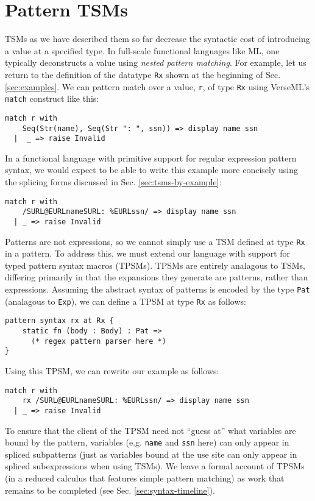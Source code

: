 {\chapter{Pattern TSMs}\label{sec:pattern-tsms}
TSMs as we have described them so far decrease the syntactic cost of introducing a value at a specified type. In full-scale functional languages like ML, one typically deconstructs a value using \emph{nested pattern matching}. For example, let us return to the definition of the datatype \lstinline{Rx} shown at the beginning of Sec. \ref{sec:examples}. We can pattern match over a value, \lstinline{r}, of type \lstinline{Rx} using VerseML's \lstinline{match} construct like this:
\begin{lstlisting}[numbers=none]
match r with 
    Seq(Str(name), Seq(Str ": ", ssn)) => display name ssn
  |  _ => raise Invalid
\end{lstlisting}
In a functional language with primitive support for regular expression pattern syntax, we would expect to be able to write this example more concisely using the splicing forms discussed in Sec. \ref{sec:tsms-by-example}:
\begin{lstlisting}[numbers=none]
match r with 
    /SURL@EURLnameSURL: %EURLssn/ => display name ssn
  | _ => raise Invalid
\end{lstlisting}

Patterns are not expressions, so we cannot simply use a TSM defined at type \lstinline{Rx} in a pattern. To address this, we must extend our language with support for typed pattern syntax macros (TPSMs). TPSMs are entirely analagous to TSMs, differing primarily in that the expansions they generate are patterns, rather than expressions. Assuming the abstract syntax of patterns is encoded by the type \lstinline{Pat} (analagous to \lstinline{Exp}), we can define a TPSM at type \lstinline{Rx} as follows:
\begin{lstlisting}[numbers=none]
pattern syntax rx at Rx {
	static fn (body : Body) : Pat => 
	  (* regex pattern parser here *)
}
\end{lstlisting}

Using this TPSM, we can rewrite our example as follows:
\begin{lstlisting}[numbers=none]
match r with 
    rx /SURL@EURLnameSURL: %EURLssn/ => display name ssn
  | _ => raise Invalid
\end{lstlisting}
To ensure that the client of the TPSM need not ``guess at'' what variables are bound by the pattern, variables (e.g. \lstinline{name} and \lstinline{ssn} here) can only appear in spliced subpatterns (just as variables bound at the use site can only appear in spliced subexpressions when using TSMs). We leave a formal account of TPSMs (in a reduced calculus that features simple pattern matching) as work that remains to be completed (see Sec. \ref{sec:syntax-timeline}).

}
